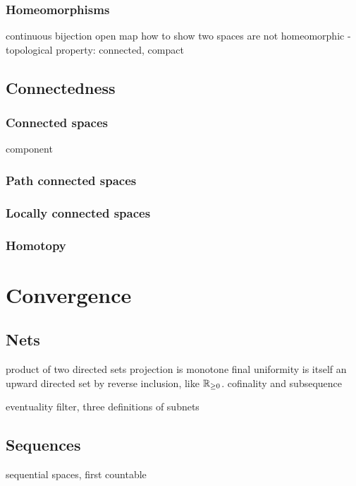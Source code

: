 \documentclass{../crs}
\begin{document}
\subsection{Homeomorphisms}
continuous bijection
open map
how to show two spaces are not homeomorphic
- topological property: connected, compact


\section{Connectedness}

\subsection{Connected spaces}
component
\subsection{Path connected spaces}

\subsection{Locally connected spaces}

\subsection{Homotopy}













\chapter{Convergence}

\section{Nets}

product of two directed sets
projection is monotone final
uniformity is itself an upward directed set by reverse inclusion, like $\mathbb{R}_{\ge0}$.
cofinality and subsequence

eventuality filter, three definitions of subnets

\section{Sequences}
sequential spaces, first countable
\end{document}

